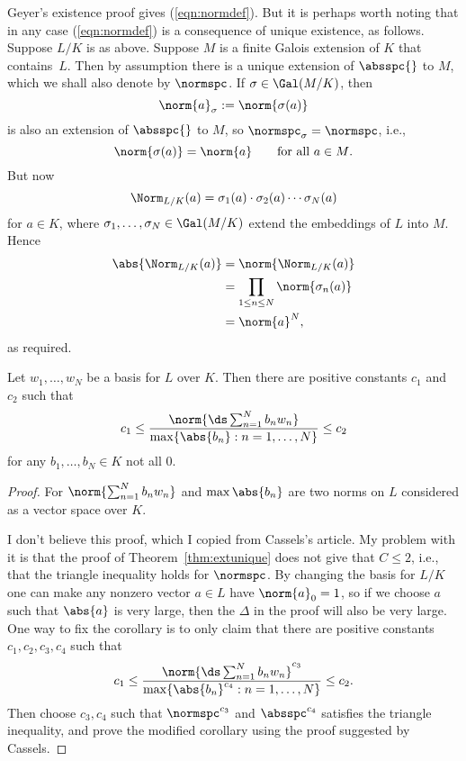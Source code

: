 \begin{remark}
  Geyer's existence proof gives (\ref{eqn:normdef}).  But it is
  perhaps worth noting that in any case (\ref{eqn:normdef}) is a
  consequence of unique existence, as follows.  Suppose $L/K$ is as
  above.  Suppose $M$ is a finite Galois extension of $K$ that
  contains~$L$.  Then by assumption there is a unique extension of
  $\absspc{}$ to $M$, which we shall also denote by $\normspc$.  If
  $\sigma\in\Gal(M/K)$, then
$$\norm{a}_\sigma := \norm{\sigma(a)}
$$
is also an extension of $\absspc{}$ to $M$, so $\normspc_\sigma = \normspc$,
i.e.,
$$ 
  \norm{\sigma(a)} = \norm{a}\qquad\text{for all $a\in M$}.
$$
But now 
$$
\Norm_{L/K}(a) = \sigma_1(a) \cdot \sigma_2(a) \cdots \sigma_N(a)
$$
for $a\in K$, where $\sigma_1,\ldots, \sigma_N\in \Gal(M/K)$ extend the embeddings
of $L$ into $M$.
Hence 
\begin{align*}
 \abs{\Norm_{L/K}(a)} &= \norm{\Norm_{L/K}(a)} \\
     &= \prod_{1\leq n \leq N} \norm{\sigma_n(a)}\\
     &= \norm{a}^N,
\end{align*}
as required.
\end{remark}

\begin{corollary} 
Let $w_1,\ldots, w_N$ be a basis for $L$ over $K$.  Then
there are positive constants $c_1$ and $c_2$ such that 
$$
   c_1 \leq \frac{\norm{\ds\sum_{n=1}^{N} b_n w_n}}{\max \{ \abs{b_n} : n = 1,\ldots, N\}} \leq c_2
$$
for any $b_1,\ldots, b_N\in K$ not all $0$.
\end{corollary}
\begin{proof}
  For $\norm{\sum_{n=1}^N b_n w_n}$ and $\max{\abs{b_n}}$ are two norms
  on $L$ considered as a vector space over $K$.  

I don't believe this
  proof, which I copied from Cassels's article.  My problem with it is
  that the proof of Theorem~\ref{thm:extunique} does not give that
  $C\leq 2$, i.e., that the triangle inequality holds for $\normspc$.  By
changing the basis for $L/K$ one can make any nonzero vector $a\in L$
have $\norm{a}_0=1$, so if we choose $a$ such that $\abs{a}$ is very large,
then the $\Delta$ in the proof will also be very large.  One way to fix
the corollary is to only claim that there are positive
constants $c_1, c_2,c_3, c_4$
such that 
$$
   c_1 \leq \frac{\norm{\ds\sum_{n=1}^{N} b_n w_n}^{c_3}}{\max \{ \abs{b_n}^{c_4} : n = 1,\ldots, N\}} \leq c_2.
$$
Then choose $c_3, c_4$ such that $\normspc^{c_3}$ and $\absspc^{c_4}$ satisfies the triangle inequality, and prove the modified corollary
using the proof suggested by Cassels.
\end{proof}

